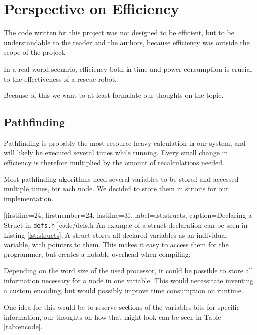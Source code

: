\chapter{Perspective on Efficiency}
The code written for this project was not designed to be efficient,
but to be understandable to the reader and the authors,
because efficiency was outside the scope of the project.

In a real world scenario,
efficiency both in time and power consumption is crucial to the effectiveness of a rescue robot.

Because of this we want to at least formulate our thoughts on the topic.
\section{Pathfinding}
Pathfinding is probably the most resource-heavy calculation in our system,
and will likely be executed several times while running.
Every small change in efficiency is therefore multiplied by the amount of recalculations needed.

Most pathfinding algorithms need several variables to be stored and accessed multiple times,
for each node.
We decided to store them in structs for our implementation.


[firstline=24,				%
firstnumber=24,
lastline=31,
label=lst:structs,	%
caption={Declaring a Struct  in {\tt defs.h}}
]{code/defs.h}
%
An example of a struct declaration can be seen in Listing \ref{lst:structs}.
A struct stores all declared variables as an individual variable,
with pointers to them.
This makes it easy to access them for the programmer,
but creates a notable overhead when compiling.

Depending on the word size of the used processor,
it could be possible to store all information necessary for a node in one variable.
This would necessitate inventing a custom encoding,
but would possibly improve time consumption on runtime.

One idea for this would be to reserve sections of the variables bits for specific information,
our thoughts on how that might look can be seen in Table \ref{tab:encode}.

